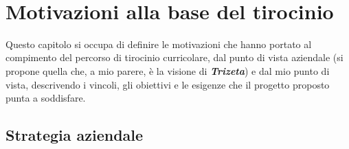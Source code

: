 \newpage \ \thispagestyle{empty} \newpage

\chapter{Motivazioni alla base del tirocinio}
\label{cap:motivazioni-tirocinio}
Questo capitolo si occupa di definire le motivazioni che hanno portato al compimento del percorso di tirocinio curricolare, dal punto di vista aziendale (si propone quella che, a mio parere, è la visione di \textit{\textbf{Trizeta}}) e dal mio punto di vista,
descrivendo i vincoli, gli obiettivi e le esigenze che il progetto proposto punta a soddisfare.

\section{Strategia aziendale}


